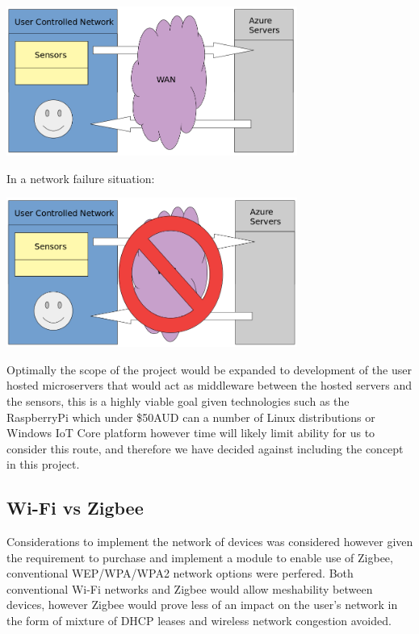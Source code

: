 \documentclass{article}
\newcounter{num}
\begin{document}
            \begin{center}
                \includegraphics[width=270pt]{Images/CurrentSystemDiagram.jpg}
            \end{center}
            In a network failure situation:
            \begin{center}
                \includegraphics[width=270pt]{Images/CurrentSystemDiagramAlternate.jpg}
            \end{center}

            Optimally the scope of the project would be expanded to development of
            the user hosted microservers that would act as middleware between
            the hosted servers and the sensors, this is a highly viable goal given
            technologies such as the RaspberryPi\cite{RPI} which under \$50AUD 
            can a number of Linux distributions or Windows IoT Core platform however
            time will likely limit ability for us to consider this route, and therefore
            we have decided against including the concept in this project.
        
        \subsection{Wi-Fi vs Zigbee}
            Considerations to implement the network of devices was considered however 
            given the requirement to purchase and implement a module
            to enable use of Zigbee, conventional WEP/WPA/WPA2 network options 
            were perfered. Both conventional Wi-Fi networks and Zigbee would allow
            meshability between devices, however Zigbee would prove less of an impact on the user's
            network in the form of mixture of DHCP leases and wireless network congestion avoided.
\end{document}
